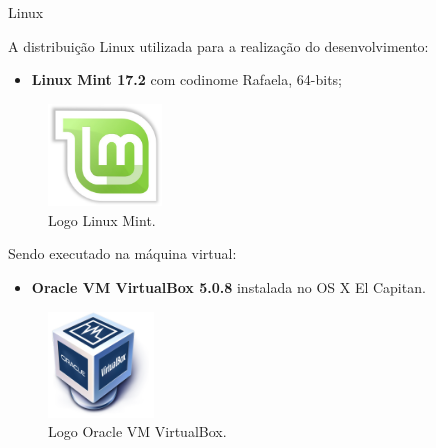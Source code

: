 	\begin{frame}{Linux}
		\begin{multicols}{2}
				A distribuição Linux utilizada para a realização do desenvolvimento:
				\bigskip
				\begin{itemize}
					\item \textbf{Linux Mint 17.2} com codinome Rafaela, 64-bits;
				\end{itemize}
				\begin{figure}[p]
					\centering
					\includegraphics[width=0.27\textwidth]{img/linux/mint.jpg}
					\caption{Logo Linux Mint.}
					\label{fig:mint}
				\end{figure}
			\columnbreak
				Sendo executado na máquina virtual:%
				\bigskip
				\begin{itemize}
					\item \textbf{Oracle VM VirtualBox 5.0.8} instalada no OS X El Capitan.
				\end{itemize}
				\begin{figure}[p]
					\centering
					\includegraphics[width=0.25\textwidth]{img/linux/vm.png}
					\caption{Logo Oracle VM VirtualBox.}
					\label{fig:vb}
				\end{figure}
		\end{multicols}
	\end{frame}



